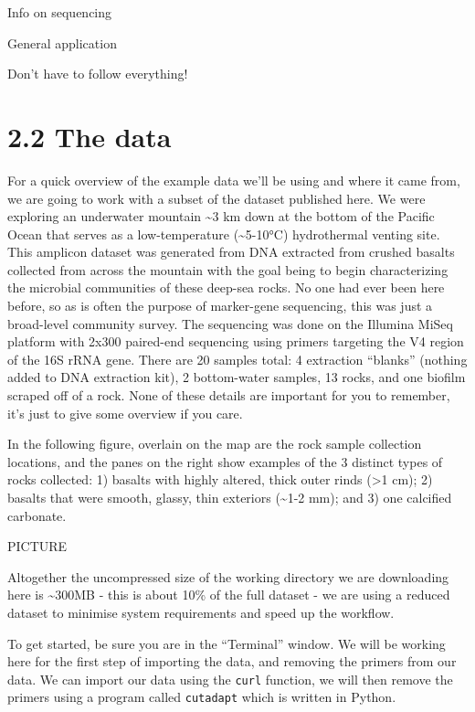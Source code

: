 \documentclass[
]{book}
\begin{document}
Info on sequencing

General application

Don't have to follow everything!

\hypertarget{the-data}{%
\section{2.2 The data}\label{the-data}}

For a quick overview of the example data we'll be using and where it came from, we are going to work with a subset of the dataset published here. We were exploring an underwater mountain \textasciitilde3 km down at the bottom of the Pacific Ocean that serves as a low-temperature (\textasciitilde5-10°C) hydrothermal venting site. This amplicon dataset was generated from DNA extracted from crushed basalts collected from across the mountain with the goal being to begin characterizing the microbial communities of these deep-sea rocks. No one had ever been here before, so as is often the purpose of marker-gene sequencing, this was just a broad-level community survey. The sequencing was done on the Illumina MiSeq platform with 2x300 paired-end sequencing using primers targeting the V4 region of the 16S rRNA gene. There are 20 samples total: 4 extraction ``blanks'' (nothing added to DNA extraction kit), 2 bottom-water samples, 13 rocks, and one biofilm scraped off of a rock. None of these details are important for you to remember, it's just to give some overview if you care.

In the following figure, overlain on the map are the rock sample collection locations, and the panes on the right show examples of the 3 distinct types of rocks collected: 1) basalts with highly altered, thick outer rinds (\textgreater1 cm); 2) basalts that were smooth, glassy, thin exteriors (\textasciitilde1-2 mm); and 3) one calcified carbonate.

PICTURE

Altogether the uncompressed size of the working directory we are downloading here is \textasciitilde300MB - this is about 10\% of the full dataset - we are using a reduced dataset to minimise system requirements and speed up the workflow.

To get started, be sure you are in the ``Terminal'' window. We will be working here for the first step of importing the data, and removing the primers from our data. We can import our data using the \texttt{curl} function, we will then remove the primers using a program called \texttt{cutadapt} which is written in Python.
\end{document}
